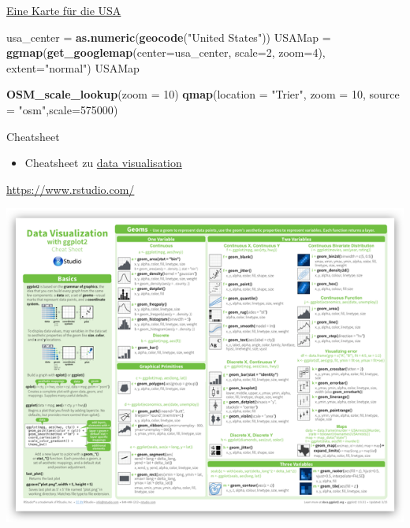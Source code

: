 \documentclass[ignorenonframetext,]{beamer}
\newenvironment{Shaded}{\begin{snugshade}}{\end{snugshade}}
\newcommand{\KeywordTok}[1]{\textcolor[rgb]{0.13,0.29,0.53}{\textbf{#1}}}
\newcommand{\DataTypeTok}[1]{\textcolor[rgb]{0.13,0.29,0.53}{#1}}
\newcommand{\DecValTok}[1]{\textcolor[rgb]{0.00,0.00,0.81}{#1}}
\newcommand{\StringTok}[1]{\textcolor[rgb]{0.31,0.60,0.02}{#1}}
\newcommand{\NormalTok}[1]{#1}
\providecommand{\tightlist}{%
  \setlength{\itemsep}{0pt}\setlength{\parskip}{0pt}}
\begin{document}
\begin{frame}[fragile]{\href{https://blog.dominodatalab.com/geographic-visualization-with-rs-ggmaps/}{Eine
Karte für die USA}}

\begin{Shaded}
\begin{Highlighting}[]
\NormalTok{usa_center =}\StringTok{ }\KeywordTok{as.numeric}\NormalTok{(}\KeywordTok{geocode}\NormalTok{(}\StringTok{"United States"}\NormalTok{))}
\NormalTok{USAMap =}\StringTok{ }\KeywordTok{ggmap}\NormalTok{(}\KeywordTok{get_googlemap}\NormalTok{(}\DataTypeTok{center=}\NormalTok{usa_center, }\DataTypeTok{scale=}\DecValTok{2}\NormalTok{, }\DataTypeTok{zoom=}\DecValTok{4}\NormalTok{), }\DataTypeTok{extent=}\StringTok{"normal"}\NormalTok{)}
\NormalTok{USAMap}
\end{Highlighting}
\end{Shaded}

\begin{Shaded}
\begin{Highlighting}[]
\KeywordTok{OSM_scale_lookup}\NormalTok{(}\DataTypeTok{zoom =} \DecValTok{10}\NormalTok{)}
\KeywordTok{qmap}\NormalTok{(}\DataTypeTok{location =} \StringTok{"Trier"}\NormalTok{, }\DataTypeTok{zoom =} \DecValTok{10}\NormalTok{, }\DataTypeTok{source =} \StringTok{"osm"}\NormalTok{,}\DataTypeTok{scale=}\DecValTok{575000}\NormalTok{)}
\end{Highlighting}
\end{Shaded}

\end{frame}

\begin{frame}{Cheatsheet}

\begin{itemize}
\tightlist
\item
  Cheatsheet zu
  \href{https://www.rstudio.com/wp-content/uploads/2015/04/ggplot2-cheatsheet.pdf}{data
  visualisation}
\end{itemize}

\url{https://www.rstudio.com/}

\includegraphics{figure/ggplot2-cheatsheet.png}

\end{frame}
\end{document}

